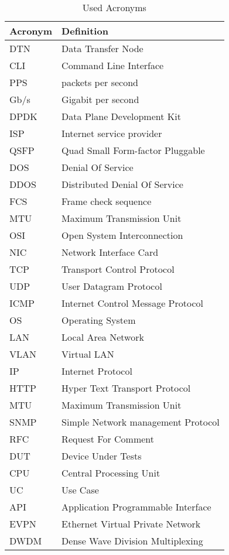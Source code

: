 \thispagestyle{empty}

\chapter{}\label{appendix:acronym}

\begin{table}[H]
\centering
\caption{Used Acronyms}
\label{table:acronyms}
\begin{tabular}{l|l}
\hline
\textbf{Acronym}                  & \textbf{Definition}  \\ \hline
DTN & Data Transfer Node \\ \hline
CLI & Command Line Interface \\ \hline
PPS & packets per second \\ \hline
Gb/s & Gigabit per second \\ \hline
DPDK & Data Plane Development Kit \\ \hline
ISP & Internet service provider \\ \hline
QSFP & Quad Small Form-factor Pluggable \\ \hline
DOS & Denial Of Service \\ \hline
DDOS & Distributed Denial Of Service \\ \hline
FCS & Frame check sequence \\ \hline
MTU & Maximum Transmission Unit \\ \hline
OSI & Open System Interconnection \\ \hline
NIC & Network Interface Card \\ \hline
TCP & Transport Control Protocol \\ \hline
UDP & User Datagram Protocol \\ \hline
ICMP & Internet Control Message Protocol \\ \hline
OS & Operating System \\ \hline
LAN & Local Area Network \\ \hline
VLAN & Virtual LAN \\ \hline
IP & Internet Protocol \\ \hline
HTTP & Hyper Text Transport Protocol \\ \hline
MTU & Maximum Transmission Unit \\ \hline
SNMP & Simple Network management Protocol \\ \hline
RFC & Request For Comment \\ \hline
DUT & Device Under Tests \\ \hline
CPU & Central Processing Unit \\ \hline
UC & Use Case \\ \hline
API & Application Programmable Interface \\ \hline
EVPN & Ethernet Virtual Private Network \\ \hline
DWDM & Dense Wave Division Multiplexing \\ \hline
\end{tabular}
\end{table}

